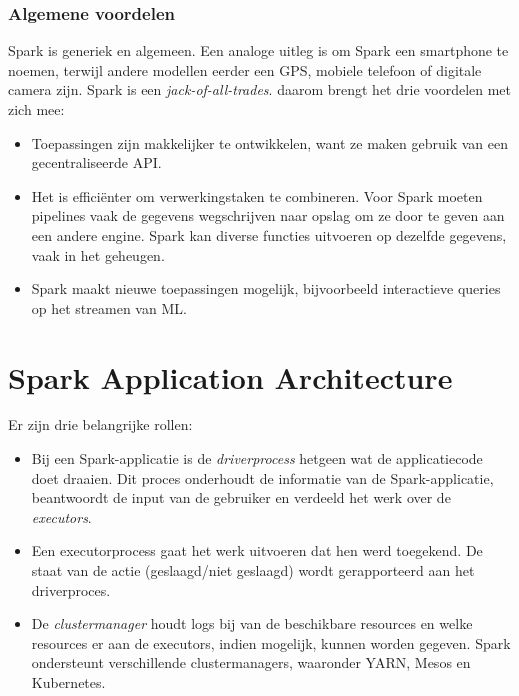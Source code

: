\documentclass[a4paper,10pt,twoside]{report}
\begin{document}
\subsubsection{Algemene voordelen}

Spark is generiek en algemeen. Een analoge uitleg is om Spark een smartphone te noemen, terwijl andere modellen eerder een GPS, mobiele telefoon of digitale camera zijn. Spark is een \textit{jack-of-all-trades}. daarom brengt het drie voordelen met zich mee:

\begin{itemize}
	\item Toepassingen zijn makkelijker te ontwikkelen, want ze maken gebruik van een gecentraliseerde API.
	\item Het is efficiënter om verwerkingstaken te combineren. Voor Spark moeten pipelines vaak de gegevens wegschrijven naar opslag om ze door te geven aan een andere engine. Spark kan diverse functies uitvoeren op dezelfde gegevens, vaak in het geheugen.
	\item Spark maakt nieuwe toepassingen mogelijk, bijvoorbeeld interactieve queries op het streamen van ML.
\end{itemize}

\section{Spark Application Architecture}

Er zijn drie belangrijke rollen:

\begin{itemize}
	\item Bij een Spark-applicatie is de \textit{driverprocess} hetgeen wat de applicatiecode doet draaien. Dit proces onderhoudt de informatie van de Spark-applicatie, beantwoordt de input van de gebruiker en verdeeld het werk over de \textit{executors}.
	\item Een executorprocess gaat het werk uitvoeren dat hen werd toegekend. De staat van de actie (geslaagd/niet geslaagd) wordt gerapporteerd aan het driverproces.
	\item De \textit{clustermanager} houdt logs bij van de beschikbare resources en welke resources er aan de executors, indien mogelijk, kunnen worden gegeven. Spark ondersteunt verschillende clustermanagers, waaronder YARN, Mesos en Kubernetes.
\end{itemize}
\end{document}
